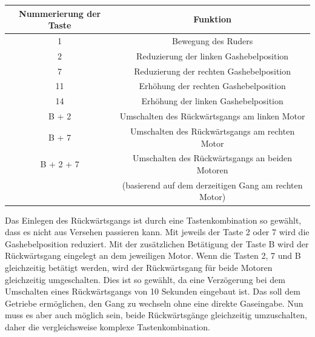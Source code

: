 \begin{table}[H]
    \begin{tabular}{|c|c|}
    \hline
    \rowcolor[gray]{0.8}
     Nummerierung der Taste & Funktion \\ \hline 
     1 & Bewegung des Ruders \\ \hline 
     2 & Reduzierung der linken Gashebelposition \\ \hline 
     7 & Reduzierung der rechten Gashebelposition \\ \hline
     11 & Erhöhung der rechten Gashebelposition \\ \hline
     14 & Erhöhung der linken Gashebelposition \\ \hline
     B + 2 & Umschalten des Rückwärtsgangs am linken Motor \\ \hline
     B + 7 & Umschalten des Rückwärtsgangs am rechten Motor \\ \hline
     B + 2 + 7 & Umschalten des Rückwärtsgangs an beiden Motoren \\
      & (basierend auf dem derzeitigen Gang am rechten Motor) \\ \hline
    \end{tabular}
\end{table}
Das Einlegen des Rückwärtsgangs ist durch eine Tastenkombination so gewählt, dass es nicht aus Versehen passieren kann.
Mit jeweils der Taste 2 oder 7 wird die Gashebelposition reduziert. Mit der zusätzlichen Betätigung der Taste B wird der 
Rückwärtsgang eingelegt an dem jeweiligen Motor. Wenn die Tasten 2, 7 und B gleichzeitig betätigt werden, 
wird der Rückwärtsgang für beide Motoren gleichzeitig umgeschalten. Dies ist so gewählt, da eine Verzögerung bei dem
Umschalten eines Rückwärtsgangs von 10 Sekunden eingebaut ist. Das soll dem Getriebe ermöglichen, den Gang zu wechseln
ohne eine direkte Gaseingabe. Nun muss es aber auch möglich sein, beide Rückwärtsgänge gleichzeitig umzuschalten, daher 
die vergleichsweise komplexe Tastenkombination.



